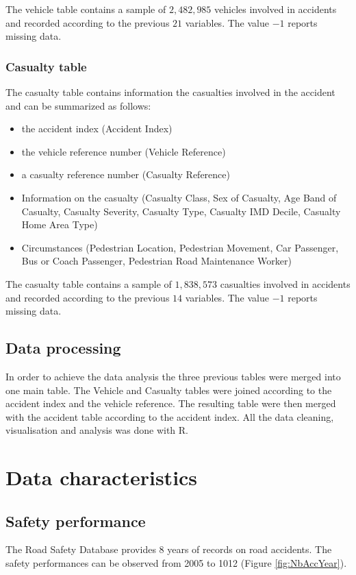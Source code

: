 \documentclass{article}
\begin{document}
The vehicle table contains a sample of $2,482,985$ vehicles involved in accidents and recorded according to the previous $21$ variables. The value $-1$ reports missing data. 


\subsubsection{Casualty table}
The casualty table contains information the casualties involved in the accident and can be summarized as follows: 
\begin{itemize}
\item the accident index (Accident Index)
\item the vehicle reference number (Vehicle Reference) 
\item a casualty reference number (Casualty Reference)
\item Information on the casualty (Casualty Class, Sex of Casualty, Age Band of Casualty, Casualty Severity, Casualty Type, Casualty IMD Decile, Casualty Home Area Type) 
\item Circumstances (Pedestrian Location, Pedestrian Movement, Car Passenger, Bus or Coach Passenger, Pedestrian Road Maintenance Worker)
\end{itemize}

The casualty table contains a sample of $1,838,573$ casualties involved in accidents and recorded according to the previous $14$ variables. The value $-1$ reports missing data. 

\subsection{Data processing}

In order to achieve the data analysis the three previous tables were merged into one main table.
The Vehicle and Casualty tables were joined according to the accident index and the vehicle reference. The resulting table were then merged with the accident table according to the accident index.
All the data cleaning, visualisation and analysis was done with R.




\section{Data characteristics}

\subsection*{Safety performance}
The Road Safety Database provides $8$ years of  records on road accidents. The safety performances can be observed from 2005 to 1012 (Figure \ref{fig:NbAccYear}).\\
\end{document}
